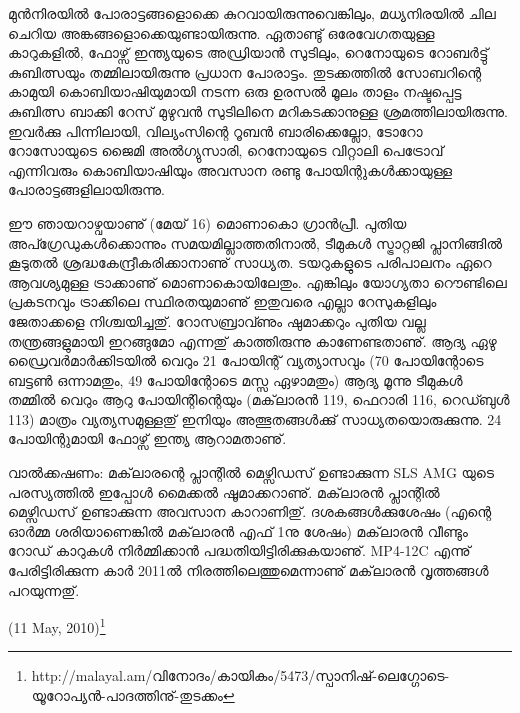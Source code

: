 മുന്‍നിരയില്‍ പോരാട്ടങ്ങളൊക്കെ കുറവായിരുന്നുവെങ്കിലും, മധ്യനിരയില്‍ ചില ചെറിയ അങ്കങ്ങളൊക്കെയുണ്ടായിരുന്നു.
ഏതാണ്ടു് ഒരേവേഗതയുള്ള കാറുകളില്‍, ഫോഴ്സ് ഇന്ത്യയുടെ അഡ്രിയാന്‍ സുടിലും, റെനോയുടെ റോബര്‍ട്ടു് കുബിത്സയും 
തമ്മിലായിരുന്നു പ്രധാന പോരാട്ടം. തുടക്കത്തില്‍ സോബറിന്റെ കാമുയി കൊബിയാഷിയുമായി നടന്ന ഒരു ഉരസല്‍ മൂലം 
താളം നഷ്ടപ്പെട്ട കുബിത്സ ബാക്കി റേസ് മുഴുവന്‍ സുടിലിനെ മറികടക്കാനുള്ള ശ്രമത്തിലായിരുന്നു. ഇവര്‍ക്കു പിന്നിലായി, 
വില്യംസിന്റെ റൂബന്‍ ബാരിക്കെല്ലോ, ടോറോ റോസോയുടെ ജൈമി അല്‍ഗ്യുസാരി, റെനോയുടെ വിറ്റാലി പെട്രോവ് 
എന്നിവരും കൊബിയാഷിയും അവസാന രണ്ടു പോയിന്റുകള്‍ക്കായുള്ള പോരാട്ടങ്ങളിലായിരുന്നു.

ഈ ഞായറാഴ്വയാണു് (മേയ് 16) മൊണാകൊ ഗ്രാന്‍പ്രീ. പുതിയ അപ്ഗ്രേഡുകള്‍ക്കൊന്നും സമയമില്ലാത്തതിനാല്‍, 
ടീമുകള്‍ സ്ട്രാറ്റജി പ്ലാനിങ്ങില്‍ കൂടുതല്‍ ശ്രദ്ധകേന്ദ്രീകരിക്കാനാണു് സാധ്യത. ടയറുകളുടെ പരിപാലനം ഏറെ ആവശ്യമുള്ള 
ട്രാക്കാണു് മൊണാകൊയിലേതും. എങ്കിലും യോഗ്യതാ റൌണ്ടിലെ പ്രകടനവും ട്രാക്കിലെ സ്ഥിരതയുമാണു് ഇതുവരെ 
എല്ലാ റേസുകളിലും ജേതാക്കളെ നിശ്ചയിച്ചതു്. റോസബ്രാവ്ണും ഷുമാക്കറും പുതിയ വല്ല തന്ത്രങ്ങളുമായി ഇറങ്ങുമോ
എന്നതു് കാത്തിരുന്നു കാണേണ്ടതാണു്. ആദ്യ ഏഴു ഡ്രൈവര്‍മാര്‍ക്കിടയില്‍ വെറും 21 പോയിന്റ് വ്യത്യാസവും 
(70 പോയിന്റോടെ ബട്ടണ്‍ ഒന്നാമതും, 49 പോയിന്റോടെ മസ്സ ഏഴാമതും) ആദ്യ മൂന്നു ടീമുകള്‍ തമ്മില്‍ വെറും ആറു 
പോയിന്റിന്റെയും (മക്‌ലാരന്‍ 119, ഫെറാരി 116, റെഡ്ബുള്‍ 113) മാത്രം വ്യത്യസമുള്ളതു് ഇനിയും അത്ഭുതങ്ങള്‍ക്കു് 
സാധ്യതയൊരുക്കുന്നു. 24 പോയിന്റുമായി ഫോഴ്സ് ഇന്ത്യ ആറാമതാണു്.

വാല്‍ക്കഷണം: മക്‌ലാരന്റെ പ്ലാന്റില്‍ മെഴ്സിഡസ് ഉണ്ടാക്കുന്ന SLS AMG യുടെ പരസ്യത്തില്‍ ഇപ്പോള്‍ മൈക്കല്‍ 
ഷൂമാക്കറാണു്. മക്‌ലാരന്‍ പ്ലാന്റില്‍ മെഴ്സിഡസ് ഉണ്ടാക്കുന്ന അവസാന കാറാണിതു്. ദശകങ്ങള്‍ക്കുശേഷം (എന്റെ 
ഓര്‍മ്മ ശരിയാണെങ്കില്‍ മക്‌ലാരന്‍ എഫ് 1നു ശേഷം) മക്‌ലാരന്‍ വീണ്ടും റോഡ് കാറുകള്‍ നിര്‍മ്മിക്കാന്‍ 
പദ്ധതിയിട്ടിരിക്കുകയാണു്. MP4-12C എന്നു് പേരിട്ടിരിക്കുന്ന കാര്‍ 2011ല്‍ നിരത്തിലെത്തുമെന്നാണു് മക്‌ലാരന്‍ 
വൃത്തങ്ങള്‍ പറയുന്നതു്.

\begin{flushright}(11 May, 2010)\footnote{http://malayal.am/വിനോദം/കായികം/5473/സ്പാനിഷ്-ലെഗ്ഗോടെ-യൂറോപ്യന്‍-പാദത്തിനു്-തുടക്കം}\end{flushright}

\newpage
